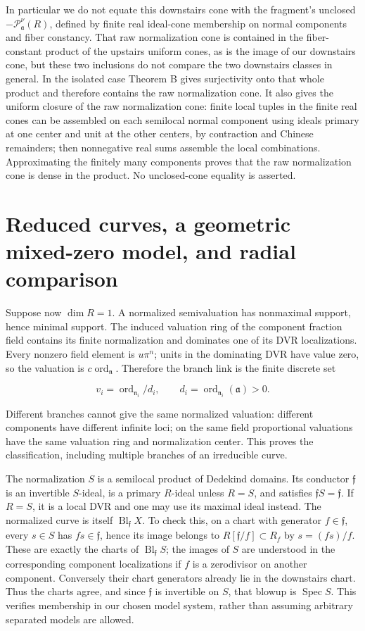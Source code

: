 \documentclass[11pt]{article}
\begin{document}
In particular we do not equate this downstairs cone with the fragment's unclosed \(-\mathcal P^{\nu}_{\mathfrak a}(R)\), defined by finite real ideal-cone membership on normal components and fiber constancy. That raw normalization cone is contained in the fiber-constant product of the upstairs uniform cones, as is the image of our downstairs cone, but these two inclusions do not compare the two downstairs classes in general. In the isolated case Theorem B gives surjectivity onto that whole product and therefore contains the raw normalization cone. It also gives the uniform closure of the raw normalization cone: finite local tuples in the finite real cones can be assembled on each semilocal normal component using ideals primary at one center and unit at the other centers, by contraction and Chinese remainders; then nonnegative real sums assemble the local combinations. Approximating the finitely many components proves that the raw normalization cone is dense in the product. No unclosed-cone equality is asserted.

\section{Reduced curves, a geometric mixed-zero model, and radial comparison}

Suppose now \(\dim R=1\). A normalized semivaluation has nonmaximal support, hence minimal support. The induced valuation ring of the component fraction field contains its finite normalization and dominates one of its DVR localizations. Every nonzero field element is \(u\pi^n\); units in the dominating DVR have value zero, so the valuation is \(c\operatorname{ord}_{\mathfrak n}\). Therefore the branch link is the finite discrete set

\[
v_i=\operatorname{ord}_{\mathfrak n_i}/d_i,\qquad d_i=\operatorname{ord}_{\mathfrak n_i}(\mathfrak a)>0.
\]

Different branches cannot give the same normalized valuation: different components have different infinite loci; on the same field proportional valuations have the same valuation ring and normalization center. This proves the classification, including multiple branches of an irreducible curve.

The normalization \(S\) is a semilocal product of Dedekind domains. Its conductor \(\mathfrak f\) is an invertible \(S\)-ideal, is a primary \(R\)-ideal unless \(R=S\), and satisfies \(\mathfrak fS=\mathfrak f\). If \(R=S\), it is a local DVR and one may use its maximal ideal instead. The normalized curve is itself \(\operatorname{Bl}_{\mathfrak f}X\). To check this, on a chart with generator \(f\in\mathfrak f\), every \(s\in S\) has \(fs\in\mathfrak f\), hence its image belongs to \(R[\mathfrak f/f]\subset R_f\) by \(s=(fs)/f\). These are exactly the charts of \(\operatorname{Bl}_{\mathfrak f}S\); the images of \(S\) are understood in the corresponding component localizations if \(f\) is a zerodivisor on another component. Conversely their chart generators already lie in the downstairs chart. Thus the charts agree, and since \(\mathfrak f\) is invertible on \(S\), that blowup is \(\operatorname{Spec}S\). This verifies membership in our chosen model system, rather than assuming arbitrary separated models are allowed.
\end{document}
